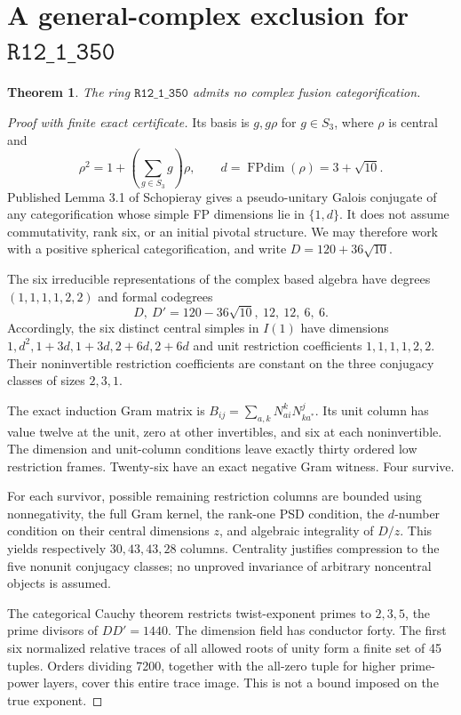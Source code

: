 \documentclass[11pt]{article}
\newtheorem{theorem}{Theorem}
\newcommand{\R}[1]{\texttt{R12\_1\_#1}}
\newcommand{\FPdim}{\operatorname{FPdim}}
\begin{document}
\section{A general-complex exclusion for \texorpdfstring{$\R{350}$}{R12-1-350}}
\begin{theorem}
The ring $\R{350}$ admits no complex fusion categorification.
\end{theorem}
\begin{proof}[Proof with finite exact certificate]
Its basis is $g,g\rho$ for $g\in S_3$, where $\rho$ is central and
\[
\rho^2=1+\left(\sum_{g\in S_3}g\right)\rho,\qquad
d=\FPdim(\rho)=3+\sqrt{10}.
\]
Published Lemma 3.1 of Schopieray \cite{Sch} gives a pseudo-unitary Galois
conjugate of any categorification whose simple FP dimensions lie in
$\{1,d\}$. It does not assume commutativity, rank six, or an initial
pivotal structure. We may therefore work with a positive spherical
categorification, and write $D=120+36\sqrt{10}$.

The six irreducible representations of the complex based algebra have
degrees $(1,1,1,1,2,2)$ and formal codegrees
\[
D,\ D'=120-36\sqrt{10},\ 12,\ 12,\ 6,\ 6.
\]
Accordingly, the six distinct central simples in $I(1)$ have dimensions
$1,d^2,1+3d,1+3d,2+6d,2+6d$ and unit restriction coefficients
$1,1,1,1,2,2$. Their noninvertible restriction coefficients are constant
on the three conjugacy classes of sizes $2,3,1$.

The exact induction Gram matrix is
$B_{ij}=\sum_{a,k}N_{ai}^{k}N_{ka^*}^{j}$.
Its unit column has value twelve at the unit, zero at other invertibles,
and six at each noninvertible. The dimension and unit-column conditions
leave exactly thirty ordered low restriction frames. Twenty-six have
an exact negative Gram witness. Four survive.

For each survivor, possible remaining restriction columns are bounded
using nonnegativity, the full Gram kernel, the rank-one PSD condition,
the $d$-number condition on their central dimensions $z$, and algebraic integrality
of $D/z$. This yields respectively $30,43,43,28$ columns. Centrality
justifies compression to the five nonunit conjugacy classes; no
unproved invariance of arbitrary noncentral objects is assumed.

The categorical Cauchy theorem restricts twist-exponent primes to
$2,3,5$, the prime divisors of $DD'=1440$. The dimension field has
conductor forty. The first six normalized relative traces of all allowed
roots of unity form a finite set of 45 tuples. Orders dividing 7200,
together with the all-zero tuple for higher prime-power layers, cover
this entire trace image. This is not a bound imposed on the true exponent.


\end{proof}
\end{document}

